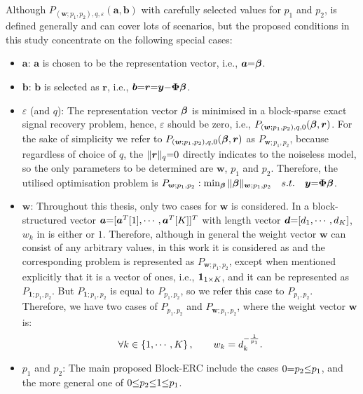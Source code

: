Although 
$P_{(\boldsymbol{w};p_1,p_2),q,\varepsilon}(\boldsymbol{a},\boldsymbol{b})$ with carefully selected values for $p_1$ and $p_2$, is defined generally and can cover lots of scenarios, but the proposed conditions in this study concentrate on the following special cases:
\begin{itemize}
\item $\boldsymbol{a}$: $\boldsymbol{a}$ is chosen to be the representation vector, i.e., $\boldsymbol{a} {=} \boldsymbol{\beta}$.
\item $\boldsymbol{b}$: $\boldsymbol{b}$ is selected as $\boldsymbol{r}$, i.e., $\boldsymbol{b} {=} \boldsymbol{r} {=} \boldsymbol{y} {-} \boldsymbol{\Phi} \boldsymbol{\beta}$.
\item $\varepsilon$ (and $q$): The representation vector $\boldsymbol{\beta}$ is minimised in a block-sparse exact signal recovery problem, hence, $\varepsilon$ should be zero, i.e., 
$P_{(\boldsymbol{w};p_1,p_2),q,0} (\boldsymbol{\beta},\boldsymbol{r})$.
For the sake of simplicity we refer to $P_{(\boldsymbol{w};p_1,p_2),q,0} (\boldsymbol{\beta},\boldsymbol{r})$
as %
$P_{\boldsymbol{w};p_1,p_2}$, because regardless of choice of $q$, the $\Vert \boldsymbol{r} \Vert _q {=} 0$ directly indicates to the noiseless model, so the only parameters to be determined are $\boldsymbol{w}$, $p_1$ and $p_2$.
Therefore, the utilised optimisation problem is $P_{\boldsymbol{w};p_1,p_2} : \min_{\boldsymbol{\beta}} \Vert \boldsymbol{\beta} \Vert_{\boldsymbol{w};p_1,p_2} \quad s.t. \quad \boldsymbol{y} {=} \boldsymbol{\Phi} \boldsymbol{\beta}$.
\item $\boldsymbol{w}$: Throughout this thesis, only two cases for $\boldsymbol{w}$ is considered. 
In a block-structured vector $\boldsymbol{a} {=} [\boldsymbol{a}^T[1], \cdots,\boldsymbol{a}^T[K]]^T$ with length vector $\boldsymbol{d} {=} [d_1, \cdots, d_K ]$, $w_k$ in  is either  or $1$.
Therefore, although in general the weight vector $\boldsymbol{w}$ can consist of any arbitrary values, in this work it is considered as  and the corresponding problem is represented as $P_{\boldsymbol{w};p_1,p_2}$, except when mentioned explicitly that it is a vector of ones, i.e., $\boldsymbol{1}_{1 {\times} K}$, and it can be represented as $P_{\boldsymbol{1};p_1,p_2}$.
But $P_{\boldsymbol{1};p_1,p_2}$ is equal to $P_{p_1,p_2}$, so we refer this case to $P_{p_1,p_2}$.
Therefore, we have two cases of $P_{p_1,p_2}$ and $P_{\boldsymbol{w};p_1,p_2}$, where the weight vector $\boldsymbol{w}$ is:
\begin{equation*}
\forall k \in \left\lbrace 1, \cdots, K \right\rbrace, \qquad w_k = d_k^{-\frac{1}{p_1}}.
\end{equation*}
\item $p_1$ and $p_2$: The main proposed Block-ERC include the cases $0 {=} p_2 {\leq} p_1$, and the more general one of $0 {\leq} p_2 {\leq} 1 {\leq} p_1$.
\end{itemize}

